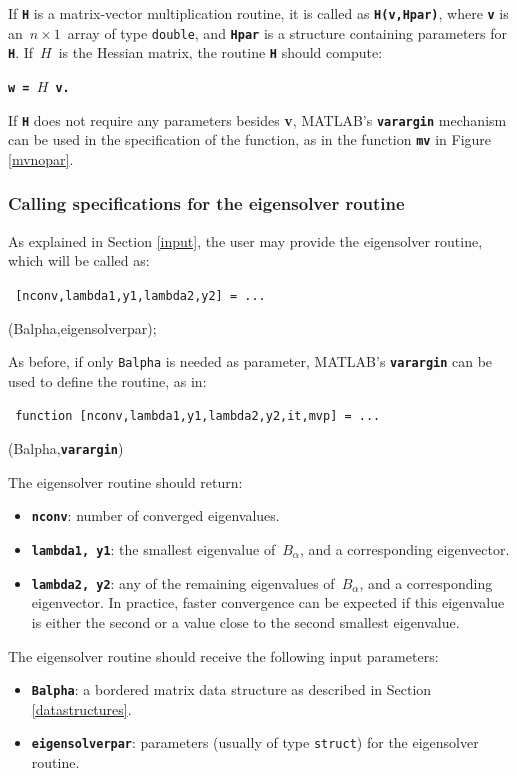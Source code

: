 \documentclass[acmtoms]{acmtrans2m}
\newcommand{\struct}{{\tt struct}}
\newcommand{\double}{{\tt double}}
\newcommand{\e}{\hspace*{2 ex}}
\newcommand{\bord}{B_{\alpha}}
\newcommand{\matlab}{MATLAB}
\newcommand{\hessian}{H}
\newcommand{\nto}{n\times 1}
\newcommand{\ds}{\displaystyle}
\begin{document}
If {\tt\bf H} is a matrix-vector multiplication routine, it is called as
{\tt\bf H(v,Hpar)}, where {\tt\bf v} is an\ $\nto$\ array of type \double,
and {\tt\bf Hpar} is a structure containing parameters for
{\tt\bf H}. If\ $\hessian$\ is the Hessian matrix, the routine {\tt\bf H} should compute:\\ 
\centerline{\tt\bf w = $\hessian$ v.}

If {\tt\bf H} does not require any parameters besides {\bf v}, 
\matlab's {\tt\bf varargin} mechanism can be used in the specification
of the function, as in the function {\tt\bf mv} in Figure \ref{mvnopar}.

\subsubsection{Calling specifications for the eigensolver routine}\label{eigensolver}

As explained in Section \ref{input}, the user may provide the eigensolver
routine, which will be called as:
\vspace{0.1cm}

{\tt
\e \e \e [nconv,lambda1,y1,lambda2,y2] = ...

\e \e \e {\tt\bf eigensolver}(Balpha,eigensolverpar);
}
\vspace{0.2cm}

As before, if only {\tt Balpha} is needed as parameter,
\matlab's {\tt\bf varargin} can be used to define the routine, as in:
\vspace{0.1cm}

{\tt
\e \e \e function [nconv,lambda1,y1,lambda2,y2,it,mvp] = ...

\e \e \e {\bf user\_eigensolver}(Balpha,{\tt\bf varargin})
}
\vspace{0.2cm}

The eigensolver routine should return:
\begin{itemize}
\item {\tt\bf nconv}: number of converged eigenvalues.\\[-0.5cm]

\item {\tt\bf lambda1, y1}: the smallest eigenvalue
of\ $\ds\bord$, and a corresponding eigenvector.\\[-0.5cm]

\item {\tt\bf lambda2, y2}: any of the remaining eigenvalues
of\ $\ds\bord$, and a corresponding eigenvector. In practice,
faster convergence can be expected if this eigenvalue is either the second
or a value close to the second smallest eigenvalue.\\[-0.5cm]
\end{itemize}
The eigensolver routine should receive the following input parameters:
\begin{itemize}
\item {\tt\bf Balpha}: a bordered matrix data structure
as described in Section \ref{datastructures}.\\[-0.5cm]

\item {\tt\bf eigensolverpar}: parameters (usually of type \struct)
for the eigensolver routine.
\end{itemize}
\end{document}
